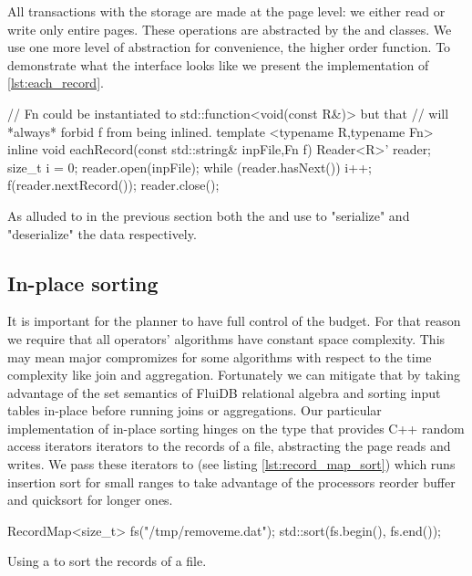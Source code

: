 All transactions with the storage are made at the page level: we
either read or write only entire pages. These operations are
abstracted by the  and  classes. We use one more level
of abstraction for convenience, the higher order 
function. To demonstrate what the interface looks like we present the
implementation of  \ref{lst:each_record}.

\begin{code}
\begin{cppcode}
// Fn could be instantiated to std::function<void(const R&)> but that
// will *always* forbid f from being inlined.
template <typename R,typename Fn>
inline void eachRecord(const std::string& inpFile,Fn f) {
  Reader<R>' reader;
  size_t i = 0;
  reader.open(inpFile);
  while (reader.hasNext()) {
    i++;
    f(reader.nextRecord());
  }
  reader.close();
}
\end{cppcode}
\caption{\label{lst:each_record}}
\end{code}

As alluded to in the previous section both the  and 
use  to "serialize" and "deserialize" the data
respectively.

\subsection{In-place sorting}

It is important for the planner to have full control of the
budget. For that reason we require that all operators' algorithms have
constant space complexity. This may mean major compromizes for some
algorithms with respect to the time complexity like join and
aggregation. Fortunately we can mitigate that by taking advantage of
the set semantics of FluiDB relational algebra and sorting input
tables in-place before running joins or aggregations. Our particular
implementation of in-place sorting hinges on the  type that
provides C++ random access iterators iterators to the records of a
file, abstracting the page reads and writes. We pass these iterators
to  (see listing \ref{lst:record_map_sort}) which runs insertion
sort for small ranges to take advantage of the processors reorder
buffer and quicksort for longer ones.

\begin{code}
\begin{cppcode}
RecordMap<size_t> fs("/tmp/removeme.dat");
std::sort(fs.begin(), fs.end());
\end{cppcode}
  \caption{\label{lst:record_map_sort}Using a  to sort
    the records of a file.}
\end{code}


